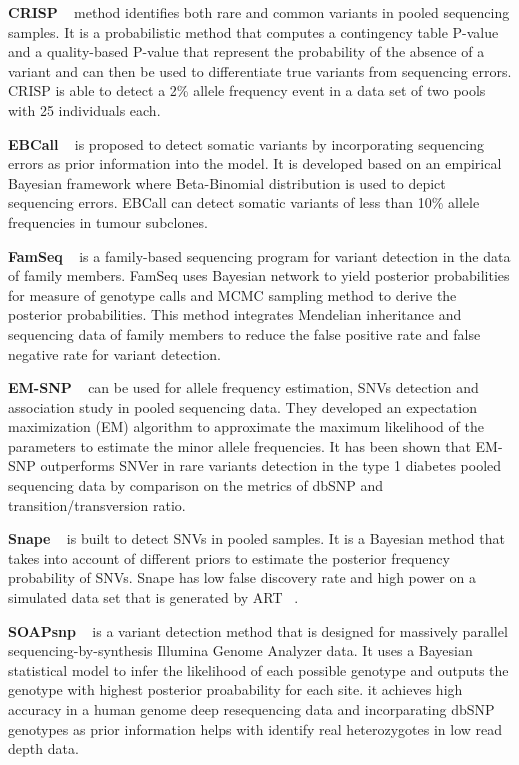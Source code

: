\documentclass[11pt,reqno]{amsart}
\begin{document}
\textbf{CRISP} ~\citep{Bansal2010} method identifies both rare and common variants in pooled sequencing samples.
It is a probabilistic method that computes a contingency table P-value and a quality-based P-value that represent the probability of the absence of a variant and can then be used to differentiate true variants from sequencing errors.
CRISP is able to detect a 2\% allele frequency event in a data set of two pools with 25 individuals each.

\textbf{EBCall} ~\citep{Shiraishi2013} is proposed to detect somatic variants by incorporating sequencing errors as prior information into the model.
It is developed based on an empirical Bayesian framework where Beta-Binomial distribution is used to depict sequencing errors.
EBCall can detect somatic variants of less than 10\% allele frequencies in tumour subclones.

\textbf{FamSeq} ~\citep{Peng2013} is a family-based sequencing program for variant detection in the data of family members.
FamSeq uses Bayesian network to yield posterior probabilities for measure of genotype calls and MCMC sampling method to derive the posterior probabilities.
This method integrates Mendelian inheritance and sequencing data of family members to reduce the false positive rate and false negative rate for variant detection.

\textbf{EM-SNP} ~\citep{Chen2013} can be used for allele frequency estimation, SNVs detection and association study in pooled sequencing data.
They developed an expectation maximization (EM) algorithm to approximate the maximum likelihood of the parameters to estimate the minor allele frequencies.
It has been shown that EM-SNP outperforms SNVer in rare variants detection in the type 1 diabetes pooled sequencing data by comparison on the metrics of dbSNP and transition/transversion ratio.

\textbf{Snape} ~\citep{Raineri2012} is built to detect SNVs in pooled samples.
It is a Bayesian method that takes into account of different priors to estimate the posterior frequency probability of SNVs.
Snape has low false discovery rate and high power on a simulated data set that is generated by ART ~\citep{huang2012art}.

\textbf{SOAPsnp} ~\citep{Li2009} is a variant detection method that is designed for massively parallel sequencing-by-synthesis Illumina Genome Analyzer data.
It uses a Bayesian statistical model to infer the likelihood of each possible genotype and outputs the genotype with highest posterior proabability for each site.
it achieves high accuracy in a human genome deep resequencing data and incorparating dbSNP genotypes as prior information helps with identify real heterozygotes in low read depth data.
\end{document}
